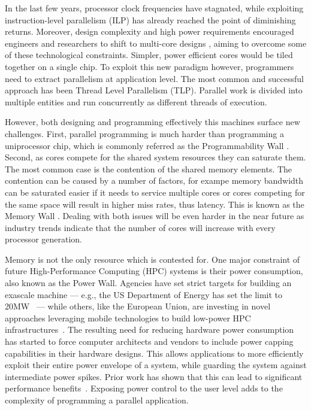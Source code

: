 In the last few years, processor clock frequencies have
stagnated, while exploiting instruction-level parallelism
(ILP) has already reached the point of diminishing returns.
Moreover, design complexity and high power requirements
encouraged engineers and researchers to shift to
multi-core designs \cite{Kalla:2004:IPC:1435718.1437666,Kongetira:2005:NMS:1069597.1069758,RamanathanIntelMulticore}, aiming to overcome some of these technological constraints.  
Simpler, power efficient cores would be tiled together on a single chip.  
To exploit this new paradigm however, programmers need to extract parallelism
at application level.  The most common and successful approach
has been Thread Level Parallelism (TLP).  Parallel work is 
divided into multiple entities and run concurrently as different threads of execution.


However, both designing and programming effectively this machines surface new challenges.
First, parallel programming is much harder than programming a uniprocessor chip, 
which is commonly referred as the Programmability Wall \cite{Chapman:2007multicore}.  Second, as cores compete 
for the shared system resources they can saturate them.  The most common case is the contention
of the shared memory elements.  The contention can be caused by a number of factors, for exampe
memory bandwidth can be saturated easier if it needs to service multiple cores or cores competing 
for the same space will result in higher miss rates, thus latency.  This is known as the Memory Wall \cite{Hennessy:2006:CAF:1200662, Mahapatra:1999:PBP:357783.331677}.  
Dealing with both issues will be even harder in the near 
future as industry trends \cite{RamanathanIntelMulticore} indicate that the number of cores will increase with every processor generation.

Memory is not the only resource which is contested for. One major constraint of future High-Performance Computing (HPC) systems 
is their power consumption, also known as the Power Wall.  Agencies have set strict targets for building an exascale machine --- e.g.,  the US Department of Energy has set the limit to 
20MW~\cite{Ashby2010} --- while others, like the European Union, are investing in novel approaches 
leveraging mobile technologies to build low-power HPC infrastructures~\cite{rajovic2013}.
The resulting need for reducing hardware power consumption has started to force computer architects and vendors to include power capping capabilities in their hardware designs. 
This allows applications to more efficiently exploit their entire power envelope of a system, while  guarding the system against intermediate power spikes. 
Prior work has shown that this can lead to significant performance benefits~\cite{patki:2013:eho:2464996.2465009,conductor2015}.
Exposing power control to the user level adds to the complexity of programming a parallel application.



